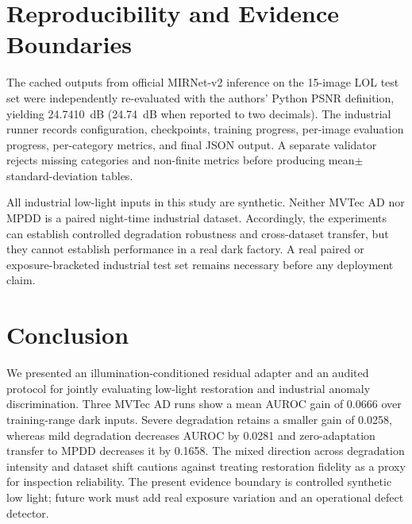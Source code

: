 \documentclass[10pt,journal]{IEEEtran}
\begin{document}
\begin{table}[t]
\centering
\caption{Robustness and cross-dataset evaluation.}
\label{tab:robustness}
\end{table}

\section{Reproducibility and Evidence Boundaries}
The cached outputs from official MIRNet-v2 inference on the 15-image LOL test set were independently re-evaluated with the authors' Python PSNR definition, yielding 24.7410~dB (24.74~dB when reported to two decimals). The industrial runner records configuration, checkpoints, training progress, per-image evaluation progress, per-category metrics, and final JSON output. A separate validator rejects missing categories and non-finite metrics before producing mean$\pm$standard-deviation tables.

All industrial low-light inputs in this study are synthetic. Neither MVTec AD nor MPDD is a paired night-time industrial dataset. Accordingly, the experiments can establish controlled degradation robustness and cross-dataset transfer, but they cannot establish performance in a real dark factory. A real paired or exposure-bracketed industrial test set remains necessary before any deployment claim.

\section{Conclusion}
We presented an illumination-conditioned residual adapter and an audited protocol for jointly evaluating low-light restoration and industrial anomaly discrimination. Three MVTec AD runs show a mean AUROC gain of 0.0666 over training-range dark inputs. Severe degradation retains a smaller gain of 0.0258, whereas mild degradation decreases AUROC by 0.0281 and zero-adaptation transfer to MPDD decreases it by 0.1658. The mixed direction across degradation intensity and dataset shift cautions against treating restoration fidelity as a proxy for inspection reliability.
The present evidence boundary is controlled synthetic low light; future work must add real exposure variation and an operational defect detector.



\end{document}
